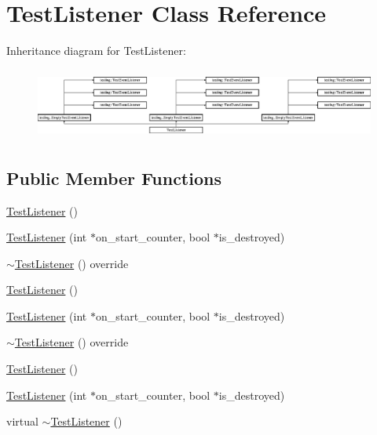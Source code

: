 \hypertarget{class_test_listener}{}\section{Test\+Listener Class Reference}
\label{class_test_listener}
Inheritance diagram for Test\+Listener\+:\begin{figure}[H]
\begin{center}
\leavevmode
\includegraphics[height=2.380952cm]{d2/d5d/class_test_listener}
\end{center}
\end{figure}
\subsection*{Public Member Functions}
\begin{DoxyCompactItemize}
\item 
\mbox{\hyperlink{class_test_listener_ae20c874ce92777371de6d024df229e9f}{Test\+Listener}} ()
\item 
\mbox{\hyperlink{class_test_listener_ab65604c6c3742c494e9378e770da5d42}{Test\+Listener}} (int $\ast$on\+\_\+start\+\_\+counter, bool $\ast$is\+\_\+destroyed)
\item 
\mbox{\hyperlink{class_test_listener_ab0032a5f22785a30e4581617c1392ae0}{$\sim$\+Test\+Listener}} () override
\item 
\mbox{\hyperlink{class_test_listener_ae20c874ce92777371de6d024df229e9f}{Test\+Listener}} ()
\item 
\mbox{\hyperlink{class_test_listener_ab65604c6c3742c494e9378e770da5d42}{Test\+Listener}} (int $\ast$on\+\_\+start\+\_\+counter, bool $\ast$is\+\_\+destroyed)
\item 
\mbox{\hyperlink{class_test_listener_ab0032a5f22785a30e4581617c1392ae0}{$\sim$\+Test\+Listener}} () override
\item 
\mbox{\hyperlink{class_test_listener_ae20c874ce92777371de6d024df229e9f}{Test\+Listener}} ()
\item 
\mbox{\hyperlink{class_test_listener_ab65604c6c3742c494e9378e770da5d42}{Test\+Listener}} (int $\ast$on\+\_\+start\+\_\+counter, bool $\ast$is\+\_\+destroyed)
\item 
virtual \mbox{\hyperlink{class_test_listener_ae59dec3ae673618185eebf71881902e9}{$\sim$\+Test\+Listener}} ()
\end{DoxyCompactItemize}
